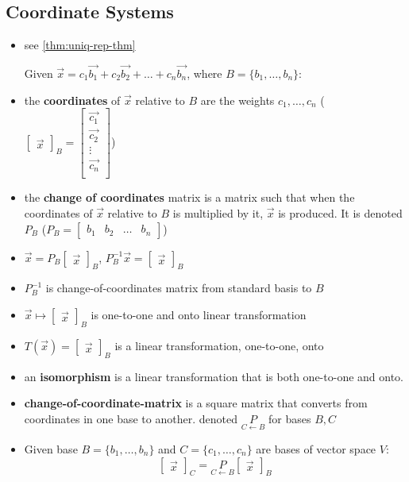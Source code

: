 \documentclass[a4paper,12pt]{article}
\theoremstyle{definition}
\theoremstyle{definition}
\newcommand{\mateq}[3]{#1#2 = #3}
\newcommand{\finitevecs}[2]{#1_1,\ldots,#1_#2}
\newcommand{\finitevecsset}[2]{\{\finitevecs{#1}{#2}\}}
\newcommand{\finiteadd}[3]{#1 + #2 + \ldots + #3}
\newcommand{\basiscoordvec}[2]{
	\begin{bmatrix}
		\vec{#1}
	\end{bmatrix}_#2
}
\newcommand{\chngbasismat}[2]{
	\underset{#2 \leftarrow #1}{P}
}
\begin{document}
	\subsection{Coordinate Systems}
	\begin{itemize}
		\item see \autoref{thm:uniq-rep-thm}
		
		Given $\vec{x} = \finiteadd{c_1\vec{b_1}}{c_2\vec{b_2}}{c_n\vec{b_n}}$, where $B = \finitevecsset{b}{n}$:
		
		\item the \textbf{coordinates} of $\vec{x}$ relative to $B$ are the weights $\finitevecs{c}{n}$ ($\basiscoordvec{x}{B}
		=
		\begin{bmatrix}
			\vec{c_1}\\
			\vec{c_2}\\
			\vdots\\
			\vec{c_n}\\
		\end{bmatrix}$)
		
		\item the \textbf{change of coordinates} matrix is a matrix such that when the coordinates of $\vec{x}$ relative to $B$ is multiplied by it, $\vec{x}$ is produced. It is denoted $P_B$ ($P_B =
		\begin{bmatrix}
			b_1 & b_2 & \ldots &b_n
		\end{bmatrix}$)
		
		\item $\vec{x} = P_B\basiscoordvec{x}{B}$, $P^{-1}_B\vec{x} = \basiscoordvec{x}{B}$
		
		\item $P^{-1}_B$ is change-of-coordinates matrix from standard basis to $B$
		
		\item $\vec{x} \mapsto \basiscoordvec{x}{B}$ is one-to-one and onto linear transformation
		
		\item $\mateq{T}{(\vec{x})}{\basiscoordvec{x}{B}}$ is a linear transformation, one-to-one, onto
		
		\item an \textbf{isomorphism} is a linear transformation that is both one-to-one and onto.
		
		\item \textbf{change-of-coordinate-matrix} is a square matrix that converts from coordinates in one base to another. denoted $\chngbasismat{B}{C}$ for bases $B, C$
		
		\item Given base $B = \finitevecsset{b}{n}$ and $C = \finitevecsset{c}{n}$ are bases of vector space $V$:
		\begin{equation*}
			\basiscoordvec{x}{C} = \chngbasismat{B}{C}\basiscoordvec{x}{B}
		\end{equation*}
		

\end{itemize}
\end{document}
